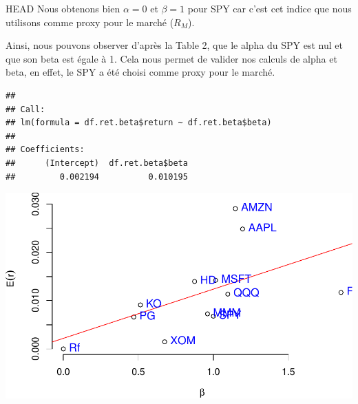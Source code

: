 \documentclass[
]{article}
\begin{document}
\begin{table}[H]

\caption{\label{tab:unnamed-chunk-7}Alpha and Beta for each asset}
\centering
{}
\end{table}

HEAD Nous obtenons bien \(\alpha = 0\) et \(\beta = 1\) pour SPY car
c'est cet indice que nous utilisons comme proxy pour le marché
(\(R_{M}\)).

Ainsi, nous pouvons observer d'après la Table 2, que le alpha du SPY est
nul et que son beta est égale à 1. Cela nous permet de valider nos
calculs de alpha et beta, en effet, le SPY a été choisi comme proxy pour
le marché.

\begin{verbatim}
## 
## Call:
## lm(formula = df.ret.beta$return ~ df.ret.beta$beta)
## 
## Coefficients:
##      (Intercept)  df.ret.beta$beta  
##         0.002194          0.010195
\end{verbatim}

\includegraphics{TP-3_files/figure-latex/unnamed-chunk-8-1.pdf}
\end{document}

